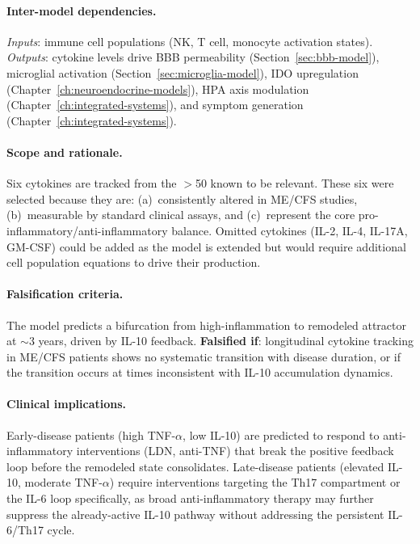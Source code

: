 \paragraph{Inter-model dependencies.}
\emph{Inputs}: immune cell populations (NK, T cell, monocyte activation states). \emph{Outputs}: cytokine levels drive BBB permeability (Section~\ref{sec:bbb-model}), microglial activation (Section~\ref{sec:microglia-model}), IDO upregulation (Chapter~\ref{ch:neuroendocrine-models}), HPA axis modulation (Chapter~\ref{ch:integrated-systems}), and symptom generation (Chapter~\ref{ch:integrated-systems}).

\paragraph{Scope and rationale.}
Six cytokines are tracked from the $>$50 known to be relevant. These six were selected because they are: (a)~consistently altered in ME/CFS studies, (b)~measurable by standard clinical assays, and (c)~represent the core pro-inflammatory/anti-inflammatory balance. Omitted cytokines (IL-2, IL-4, IL-17A, GM-CSF) could be added as the model is extended but would require additional cell population equations to drive their production.

\paragraph{Falsification criteria.}
The model predicts a bifurcation from high-inflammation to remodeled attractor at $\sim$3 years, driven by IL-10 feedback. \textbf{Falsified if}: longitudinal cytokine tracking in ME/CFS patients shows no systematic transition with disease duration, or if the transition occurs at times inconsistent with IL-10 accumulation dynamics.

\paragraph{Clinical implications.}
Early-disease patients (high TNF-$\alpha$, low IL-10) are predicted to respond to anti-inflammatory interventions (LDN, anti-TNF) that break the positive feedback loop before the remodeled state consolidates. Late-disease patients (elevated IL-10, moderate TNF-$\alpha$) require interventions targeting the Th17 compartment or the IL-6 loop specifically, as broad anti-inflammatory therapy may further suppress the already-active IL-10 pathway without addressing the persistent IL-6/Th17 cycle.

